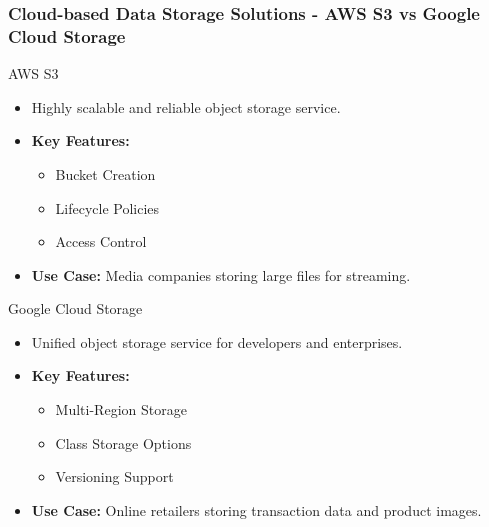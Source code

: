 \documentclass[aspectratio=169]{beamer}
\begin{document}
\begin{frame}[fragile]
    \frametitle{Cloud-based Data Storage Solutions - AWS S3 vs Google Cloud Storage}
    \begin{block}{AWS S3}
        \begin{itemize}
            \item Highly scalable and reliable object storage service.
            \item \textbf{Key Features:}
            \begin{itemize}
                \item Bucket Creation
                \item Lifecycle Policies
                \item Access Control
            \end{itemize}
            \item \textbf{Use Case:} Media companies storing large files for streaming.
        \end{itemize}
    \end{block}

    \begin{block}{Google Cloud Storage}
        \begin{itemize}
            \item Unified object storage service for developers and enterprises.
            \item \textbf{Key Features:}
            \begin{itemize}
                \item Multi-Region Storage
                \item Class Storage Options
                \item Versioning Support
            \end{itemize}
            \item \textbf{Use Case:} Online retailers storing transaction data and product images.
        \end{itemize}
    \end{block}
\end{frame}
\end{document}
